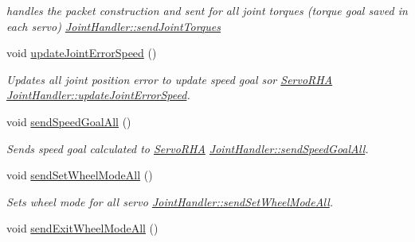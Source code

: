 \begin{DoxyCompactItemize}
\begin{DoxyCompactList}\small\item\em handles the packet construction and sent for all joint torques (torque goal saved in each servo)  \hyperlink{classJointHandler_a9c5ad1c7aca5efeba1df8a82de596acf}{Joint\+Handler\+::send\+Joint\+Torques} \end{DoxyCompactList}\item 
void \hyperlink{classJointHandler_acf6a0134ccb850298f3b81e191ad4151}{update\+Joint\+Error\+Speed} ()\hypertarget{classJointHandler_acf6a0134ccb850298f3b81e191ad4151}{}\label{classJointHandler_acf6a0134ccb850298f3b81e191ad4151}

\begin{DoxyCompactList}\small\item\em Updates all joint position error to update speed goal sor \hyperlink{classServoRHA}{Servo\+R\+HA}  \hyperlink{classJointHandler_acf6a0134ccb850298f3b81e191ad4151}{Joint\+Handler\+::update\+Joint\+Error\+Speed}. \end{DoxyCompactList}\item 
void \hyperlink{classJointHandler_a81d3c45328fc3f646769598fdcc75027}{send\+Speed\+Goal\+All} ()\hypertarget{classJointHandler_a81d3c45328fc3f646769598fdcc75027}{}\label{classJointHandler_a81d3c45328fc3f646769598fdcc75027}

\begin{DoxyCompactList}\small\item\em Sends speed goal calculated to \hyperlink{classServoRHA}{Servo\+R\+HA}  \hyperlink{classJointHandler_a81d3c45328fc3f646769598fdcc75027}{Joint\+Handler\+::send\+Speed\+Goal\+All}. \end{DoxyCompactList}\item 
void \hyperlink{classJointHandler_aee0036fd8a3a225e1789ce09007d8f7a}{send\+Set\+Wheel\+Mode\+All} ()\hypertarget{classJointHandler_aee0036fd8a3a225e1789ce09007d8f7a}{}\label{classJointHandler_aee0036fd8a3a225e1789ce09007d8f7a}

\begin{DoxyCompactList}\small\item\em Sets wheel mode for all servo  \hyperlink{classJointHandler_aee0036fd8a3a225e1789ce09007d8f7a}{Joint\+Handler\+::send\+Set\+Wheel\+Mode\+All}. \end{DoxyCompactList}\item 
void \hyperlink{classJointHandler_a31299dcc02d8224d5f87255fcbcad99e}{send\+Exit\+Wheel\+Mode\+All} ()\hypertarget{classJointHandler_a31299dcc02d8224d5f87255fcbcad99e}{}\label{classJointHandler_a31299dcc02d8224d5f87255fcbcad99e}


\end{DoxyCompactItemize}
